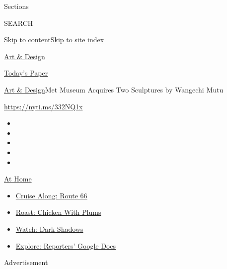 Sections

SEARCH

\protect\hyperlink{site-content}{Skip to
content}\protect\hyperlink{site-index}{Skip to site index}

\href{https://www.nytimes3xbfgragh.onion/section/arts/design}{Art \&
Design}

\href{https://myaccount.nytimes3xbfgragh.onion/auth/login?response_type=cookie\&client_id=vi}{}

\href{https://www.nytimes3xbfgragh.onion/section/todayspaper}{Today's
Paper}

\href{/section/arts/design}{Art \& Design}\textbar{}Met Museum Acquires
Two Sculptures by Wangechi Mutu

\url{https://nyti.ms/332NQ1x}

\begin{itemize}
\item
\item
\item
\item
\item
\end{itemize}

\href{https://www.nytimes3xbfgragh.onion/spotlight/at-home?action=click\&pgtype=Article\&state=default\&region=TOP_BANNER\&context=at_home_menu}{At
Home}

\begin{itemize}
\tightlist
\item
  \href{https://www.nytimes3xbfgragh.onion/2020/09/07/travel/route-66.html?action=click\&pgtype=Article\&state=default\&region=TOP_BANNER\&context=at_home_menu}{Cruise
  Along: Route 66}
\item
  \href{https://www.nytimes3xbfgragh.onion/2020/09/04/dining/sheet-pan-chicken.html?action=click\&pgtype=Article\&state=default\&region=TOP_BANNER\&context=at_home_menu}{Roast:
  Chicken With Plums}
\item
  \href{https://www.nytimes3xbfgragh.onion/2020/09/04/arts/television/dark-shadows-stream.html?action=click\&pgtype=Article\&state=default\&region=TOP_BANNER\&context=at_home_menu}{Watch:
  Dark Shadows}
\item
  \href{https://www.nytimes3xbfgragh.onion/interactive/2020/at-home/even-more-reporters-editors-diaries-lists-recommendations.html?action=click\&pgtype=Article\&state=default\&region=TOP_BANNER\&context=at_home_menu}{Explore:
  Reporters' Google Docs}
\end{itemize}

Advertisement


